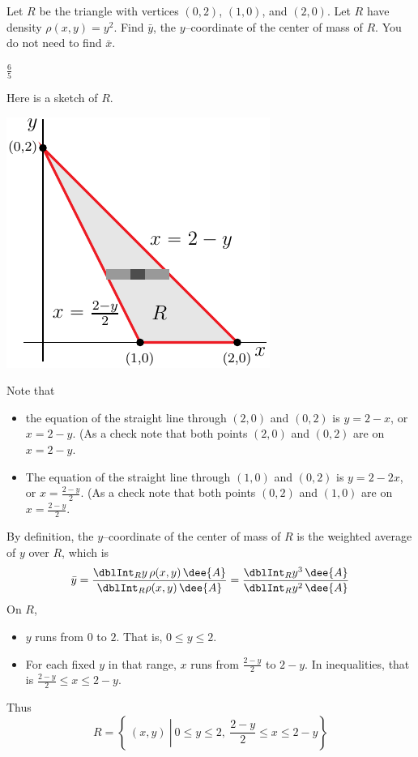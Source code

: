 \begin{question}[M200 2011D] %
Let $R$ be the triangle with vertices $(0, 2)$, $(1, 0)$, and $(2, 0)$. 
Let $R$ have density  $\rho(x, y) = y^2$.
Find $\bar y$, the $y$--coordinate of the center of mass of $R$. 
You do not need to find $\bar x$.
\end{question}

%

\begin{answer}
$\frac{6}{5}$
\end{answer}

\begin{solution}
Here is a sketch of $R$.
\begin{center}
     \includegraphics{fig/OE11D_6.pdf}
\end{center}
Note that
\begin{itemize}
\item
 the equation of the straight line through $(2,0)$ and $(0,2)$
 is $y=2-x$, or $x=2-y$. (As a check note that both points $(2,0)$ and $(0,2)$
  are on $x=2-y$.
\item
 The equation of the straight line through $(1,0)$ and $(0,2)$
 is $y=2-2x$, or $x=\frac{2-y}{2}$. (As a check note that both points 
 $(0,2)$ and $(1,0)$ are on $x=\frac{2-y}{2}$.
\end{itemize}
By definition, the $y$--coordinate of the center of mass of $R$
is the weighted average of $y$ over $R$, which is
\begin{equation*}
\bar y =\frac{\dblInt_R y\,\rho(x,y)\,\dee{A}}{\dblInt_R \rho(x,y)\,\dee{A}}
       =\frac{\dblInt_R y^3\,\dee{A}}{\dblInt_R y^2\,\dee{A}}
\end{equation*} 
On $R$,
\begin{itemize}
\item
$y$ runs from $0$ to $2$. That is, $0\le y\le 2$.
\item
For each fixed $y$ in that range, $x$ runs from $\frac{2-y}{2}$ to
$2-y$. In inequalities, that is $\frac{2-y}{2}\le x\le 2-y$.
\end{itemize}
Thus
\begin{equation*}
R = \left\{\ (x,y)\ \left|\ 0\le y\le 2,\ \frac{2-y}{2}\le x\le 2-y
                                     \right.\right\}
\end{equation*}


\end{solution}
